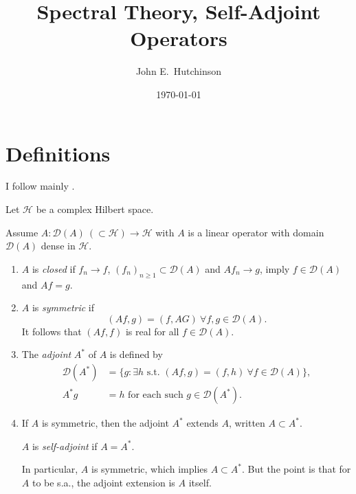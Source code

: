 \documentclass[a4paper]{amsart}
\theoremstyle{plain}
\theoremstyle{definition}
\theoremstyle{remark}
\begin{document}
\title{Spectral Theory, Self-Adjoint Operators}  
\author{John E.\ Hutchinson}
\date{\today}

\maketitle




\tableofcontents


\section{\textbf{Definitions}}

I follow mainly \cite{RN}.

\medskip
Let $ \mathcal{H} $ be a complex Hilbert space.

Assume $  A:\mathcal{D}(A) \ (\subset \mathcal{H} ) \to \mathcal{H} $ with  $ A $ is a linear operator with domain $ \mathcal{D}(A) $ dense in $ \mathcal{H} $.

\begin{enumerate}

\item 
$ A $ is \emph{closed} if $ f_n \to f $, $ (f_n)_{n\geq 1} \subset \mathcal{D}(A) $ and $ Af_n \to g $, imply $ f \in \mathcal{D}(A) $ and $ Af = g $.

\item 
 $ A $ is \emph{symmetric} if
\[ 
(Af,g) = (f, AG) \ \forall f,g \in \mathcal{D}(A).
\]
It follows that $ (Af,f) $ is real for all $ f \in \mathcal{D}(A) $.


\item The \emph{adjoint} $ A^* $ of $ A$ is defined by 
\begin{align*}
\mathcal{D}(A^*) &= \{ g : \exists h \text{ s.t. } (Af,g) = (f,h) \ \forall f \in \mathcal{D}(A) \} ,\\
   A^*g &= h \text{ for each such } g \in \mathcal{D}(A^*) .
\end{align*}



\item  If $ A $ is symmetric, then the adjoint $ A^* $   extends $ A $, written $ A\subset A^* $. 

$ A$  is \emph{self-adjoint} if $ A = A^* $.   

In particular,  $ A $ is symmetric, which implies $ A \subset A^*$.  But the point is that for $ A $ to be s.a., the adjoint extension is $ A $ itself.

\end{enumerate} 
\end{document}
